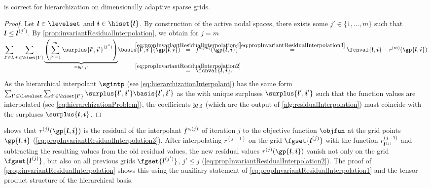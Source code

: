 \begin{corollary}
   is correct for hierarchization
  on dimensionally adaptive sparse grids.
\end{corollary}

\begin{proof}
  Let $\*l \in \levelset$ and $\*i \in \hiset{\*l}$.
  By construction of the active nodal spaces,
  there exists some $j' \in \{1, \dotsc, m\}$ such that ${\boldsymbol{l}} \le {\boldsymbol{l}}^{(j')}$.
  By \cref{prop:invariantResidualInterpolation}, we obtain
  for $j = m$
  \begin{subequations}
    \begin{align}
      \sum_{\*l' \in L} \sum_{\*i' \in \hiset{\*l'}}
      \smash{
        \underbrace{
          \left(\sum_{j''=1}^{m} \surplus{\*l',\*i'}^{(j'')}\right)
        }_{= \linout{\*l',\*i'}}
      }
      \basis{\*l',\*i'}(\gp{\*l,\*i})
      &\quad\;
      \mathclap{\overset{\eqref{eq:propInvariantResidualInterpolation4}}{=}}
      \quad\;
      f^{\sparse,(m)}(\gp{\*l,\*i})
      \overset{\eqref{eq:propInvariantResidualInterpolation3}}{=}
      \fcnval{\*l,\*i} - r^{(m)}(\gp{\*l,\*i})\\
      &\quad\;
      \mathclap{\overset{\eqref{eq:propInvariantResidualInterpolation2}}{=}}
      \quad\;
      \fcnval{\*l,\*i}.
    \end{align}
  \end{subequations}
  As the hierarchical interpolant $\sgintp$
  (see \eqref{eq:hierarchizationInterpolant})
  has the same form
  $\sum_{\*l' \in \levelset} \sum_{\*i' \in \hiset{\*l'}}
  \surplus{\*l',\*i'} \basis{\*l',\*i'}$ as the \lhs
  with unique surpluses $\surplus{\*l',\*i'}$ such that the function values
  are interpolated (see \eqref{eq:hierarchizationProblem}),
  the coefficients $y_{{\boldsymbol{l}},{\boldsymbol{i}}}$
  (which are the output of \cref{alg:residualInterpolation})
  must coincide with the surpluses $\surplus{\*l,\*i}$.
\end{proof}

 shows that
$r^{(j)}(\gp{\*l,\*i})$ is the residual of the
interpolant $f^{\mathrm{s},(j)}$ of iteration $j$
to the objective function $\objfun$ at the grid points $\gp{\*l,\*i}$
(\cref{eq:propInvariantResidualInterpolation3}).
After interpolating $r^{(j-1)}$ on the grid $\fgset{\*l^{(j)}}$
with the function $r_{{\boldsymbol{l}}^{(j)}}^{(j-1)}$
and subtracting the resulting values from the old residual values,
the new residual values $r^{(j)}(\gp{\*l,\*i})$ vanish
not only on the grid $\fgset{\*l^{(j)}}$,
but also on all previous grids $\fgset{\*l^{(j')}}$, $j' \le j$
(\cref{eq:propInvariantResidualInterpolation2}).
The proof of \cref{prop:invariantResidualInterpolation}
shows this using the auxiliary statement of
\cref{eq:propInvariantResidualInterpolation1}
and the tensor product structure of the hierarchical basis.

